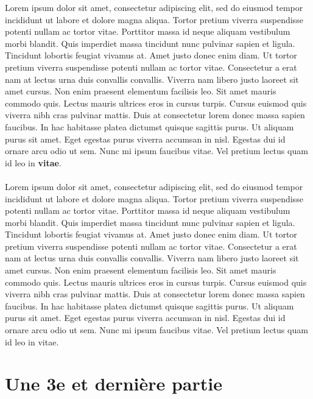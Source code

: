 Lorem ipsum dolor sit amet, consectetur adipiscing elit, sed do eiusmod
tempor incididunt ut labore et dolore magna aliqua. Tortor pretium
viverra suspendisse potenti nullam ac tortor vitae. Porttitor massa id
neque aliquam vestibulum morbi blandit. Quis imperdiet massa tincidunt
nunc pulvinar sapien et ligula. Tincidunt lobortis feugiat vivamus
at. Amet justo donec enim diam. Ut tortor pretium viverra suspendisse
potenti nullam ac tortor vitae. Consectetur a erat nam at lectus urna
duis convallis convallis. Viverra nam libero justo laoreet sit amet
cursus. Non enim praesent elementum facilisis leo. Sit amet mauris
commodo quis. Lectus mauris ultrices eros in cursus turpis. Cursus euismod
quis viverra nibh cras pulvinar mattis. Duis at consectetur lorem donec
massa sapien faucibus. In hac habitasse platea dictumst quisque sagittis
purus. Ut aliquam purus sit amet. Eget egestas purus viverra accumsan
in nisl. Egestas dui id ornare arcu odio ut sem. Nunc mi ipsum faucibus
vitae. Vel pretium lectus quam id leo in \textbf{vitae}.

\paragraph{}
Lorem ipsum dolor sit amet, consectetur adipiscing elit, sed do eiusmod
tempor incididunt ut labore et dolore magna aliqua. Tortor pretium
viverra suspendisse potenti nullam ac tortor vitae. Porttitor massa id
neque aliquam vestibulum morbi blandit. Quis imperdiet massa tincidunt
nunc pulvinar sapien et ligula. Tincidunt lobortis feugiat vivamus
at. Amet justo donec enim diam. Ut tortor pretium viverra suspendisse
potenti nullam ac tortor vitae. Consectetur a erat nam at lectus urna
duis convallis convallis. Viverra nam libero justo laoreet sit amet
cursus. Non enim praesent elementum facilisis leo. Sit amet mauris
commodo quis. Lectus mauris ultrices eros in cursus turpis. Cursus euismod
quis viverra nibh cras pulvinar mattis. Duis at consectetur lorem donec
massa sapien faucibus. In hac habitasse platea dictumst quisque sagittis
purus. Ut aliquam purus sit amet. Eget egestas purus viverra accumsan
in nisl. Egestas dui id ornare arcu odio ut sem. Nunc mi ipsum faucibus
vitae. Vel pretium lectus quam id leo in vitae.

\clearpage

\section{Une 3e et dernière partie}

